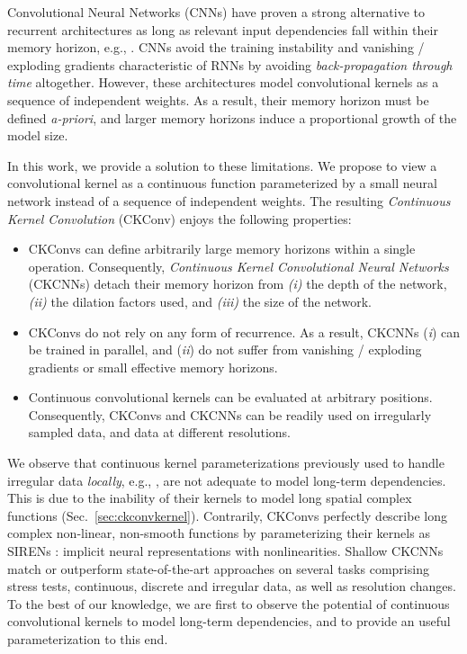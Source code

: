 \documentclass{article}
\begin{document}
Convolutional Neural Networks (CNNs) \citep{lecun1998gradient} have proven a strong alternative to recurrent architectures as long as relevant input dependencies fall within their memory horizon, e.g., \citet{conneau2016very, oord2016wavenet, dai2017very, dauphin2017language, bai2018empirical}. CNNs avoid the training instability and vanishing / exploding gradients characteristic of RNNs by avoiding \textit{back-propagation through time} \citep{werbos1990backpropagation} altogether.
However, these architectures model convolutional kernels as a sequence of independent weights. As a result, their memory horizon must be defined \textit{a-priori}, and larger memory horizons induce a proportional growth of the model size.

In this work, we provide a solution to these limitations. We propose to view a convolutional kernel as a continuous function parameterized by a small neural network instead of a sequence of independent weights. The resulting \textit{Continuous Kernel Convolution} (CKConv) enjoys the following properties:
\begin{itemize}[topsep=0pt, leftmargin=*]
    \item CKConvs can define arbitrarily large memory horizons within a single operation. Consequently, \textit{Continuous Kernel Convolutional Neural Networks} (CKCNNs) detach their memory horizon from \emph{(i)} the depth of the network, \emph{(ii)} the dilation factors used, and \emph{(iii)} the size of the network. 
    \item CKConvs do not rely on any form of recurrence. As a result, CKCNNs (\textit{i}) can be trained in parallel, and (\textit{ii}) do not suffer from vanishing / exploding gradients or small effective memory horizons.
    \item Continuous convolutional kernels can be evaluated at arbitrary positions. Consequently, CKConvs and CKCNNs can be readily used on irregularly sampled data, and data at different resolutions.
\end{itemize}
We observe that continuous kernel parameterizations previously used to handle irregular data \textit{locally}, e.g., \citet{schutt2017schnet, wu2019pointconv}, are not adequate to model long-term dependencies. This is due to the inability of their kernels to model long spatial complex functions (Sec.~\ref{sec:ckconvkernel}). Contrarily, CKConvs perfectly describe long complex non-linear, non-smooth functions by parameterizing their kernels as SIRENs \citep{sitzmann2020implicit}: implicit neural representations with  nonlinearities. Shallow CKCNNs match or outperform state-of-the-art approaches on several tasks comprising stress tests, continuous, discrete and irregular data, as well as resolution changes. To the best of our knowledge, we are first to observe the potential of continuous convolutional kernels to model long-term dependencies, and to provide an useful parameterization to this end.
\end{document}
